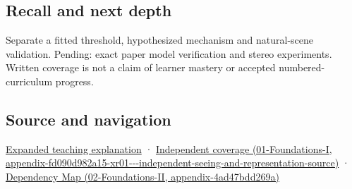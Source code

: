 \subsection{Recall and next depth}\label{appendix-8dc848f14052-recall-and-next-depth}

Separate a fitted threshold, hypothesized mechanism and natural-scene validation. Pending: exact paper model verification and stereo experiments. Written coverage is not a claim of learner mastery or accepted numbered-curriculum progress.

\subsection{Source and navigation}\label{appendix-8dc848f14052-source-and-navigation}

\href{Continuous\%20Notes/University\%20-\%20Worlds,\%20Images\%20and\%20Inference\%20-\%20Graphics,\%20Vision\%20and\%20Photography\#Binocular\%20depth\%20changes\%20the\%20optimization\%20question}{Expanded teaching explanation} · \href{../01-Foundations-I/main.pdf\#nameddest=appendix-fd090d982a15-xr01---independent-seeing-and-representation-source}{Independent coverage (01-Foundations-I, appendix-fd090d982a15-xr01-\/-\/-independent-seeing-and-representation-source)} · \href{../02-Foundations-II/main.pdf\#nameddest=appendix-4ad47bdd269a}{Dependency Map (02-Foundations-II, appendix-4ad47bdd269a)}
